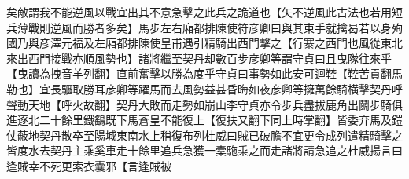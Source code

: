 矣敵謂我不能逆風以戰宜出其不意急擊之此兵之詭道也【矢不逆風此古法也若用短兵薄戰則逆風而勝者多矣】馬步左右廂都排陳使符彦卿曰與其束手就擒曷若以身殉國乃與彦澤元福及左廂都排陳使皇甫遇引精騎出西門擊之【行寨之西門也風從東北來出西門接戰亦順風勢也】諸將繼至契丹却數百步彦卿等謂守貞曰且曳隊往來乎【曳讀為拽音羊列翻】直前奮擊以勝為度乎守貞曰事勢如此安可迴鞚【鞚苦貢翻馬勒也】宜長驅取勝耳彦卿等躍馬而去風勢益甚昏晦如夜彦卿等擁萬餘騎横擊契丹呼聲動天地【呼火故翻】契丹大敗而走勢如崩山李守貞亦令步兵盡拔鹿角出鬬步騎俱進逐北二十餘里鐵鷂既下馬蒼皇不能復上【復扶又翻下同上時掌翻】皆委弃馬及鎧仗蔽地契丹散卒至陽城東南水上稍復布列杜威曰賊已破膽不宜更令成列遣精騎擊之皆度水去契丹主乘奚車走十餘里追兵急獲一槖駞乘之而走諸將請急追之杜威揚言曰逢賊幸不死更索衣囊邪【言逢賊被